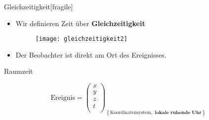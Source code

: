 \documentclass[]{beamer}%
\newcommand{\drawBasis}[5]{%
    \tikzmath{  \sLW=#2;}
    \draw[line width=1pt*\sLW,->] (0,0,0) -- (1,0,0) node[scale=#1, anchor=north east]{$#3$};
    \draw[line width=1pt*\sLW,->] (0,0,0) -- (0,1,0) node[scale=#1, anchor=south]{$#4$};
    \draw[line width=1pt*\sLW,->] (0,0,0) -- (0,0,1) node[scale=#1, anchor=south]{$#5$};
}
\newcommand{\clock}[6]{%
    \begin{scope}[xshift=#1, yshift=#2, scale=#3, line cap=round]
        \tikzmath{
            \sLW = #4;  %
        } 
        \draw [line width=1.6pt*\sLW] (0,0) circle (1.15cm);
        \foreach \angle in {0, 30, ..., 330} 
            \draw[line width=1pt*\sLW] (\angle:0.89cm) -- (\angle:1cm);
        \foreach \angle in {0,90,180,270}
            \draw[line width=1.4pt*\sLW] (\angle:0.82cm) -- (\angle:1cm);
        \draw[line width=1.6pt*\sLW] (0,0) -- (90-30*#5:0.4cm); %
        \draw[line width=1.3pt*\sLW] (0,0) -- (90-6*#6:0.65cm); %
    \end{scope}
}
\newcommand{\guy}[4]{%
    \begin{scope}[xshift=#1,yshift=#2,scale=#3]
        \tikzmath{
            \sLW = #4;  %
        } 
        \draw[line width=2pt*\sLW] (0,0) circle (1cm);               %
        \draw[fill=black] (35:0.3cm) circle (0.08cm*\sLW);           %
        \draw[fill=black] (145:0.3cm) circle (0.08cm*\sLW);          %
        \draw[line width=2pt*\sLW] ([shift={+(0cm,0cm)}]245:0.5cm) arc (245:295:0.5cm);
        
        \draw[line width=2pt*\sLW] (0,-1cm) -- ++(-90:2.25cm);       %
        \draw[line width=2pt*\sLW] (0,-2cm) -- ++(30:1.5cm);         %
        \draw[line width=2pt*\sLW] (0,-2cm) -- ++(150:1.5cm);        %
        \draw[line width=2pt*\sLW] (0,-3.25cm) -- ++(-60:1.5cm);     %
        \draw[line width=2pt*\sLW] (0,-3.25cm) -- ++(240:1.5cm);     %
    \end{scope}
}
\newcommand{\rail}[5]{%
    \begin{scope}[xshift=#1, yshift=#2, scale=#3]
        \tikzmath{
            \sLW = #4;
        }
        \draw[line width=2pt*\sLW] (-0.1cm,0) -- (#5,0);
        \draw[line width=1pt*\sLW, dashed] (0,-0.1cm) node[below]{Ziel} -- (0,2cm) ;
    \end{scope}
}
\newcommand{\locomotive}[4]{%
    \begin{scope}[xshift=#1, yshift=#2, scale=#3]
        \tikzmath{
            \sLW = #4;
        }
        \draw[line width=2pt*\sLW] (0,0.3cm) 
            -- ++(6cm,  0) 
            -- ++(0,    1.4cm) 
            -- ++(-5cm, 0) 
            --   (0,    0.3cm);
        \draw[line width=2pt*\sLW] (0.5cm,0.9cm) -- ++(1.5cm,0) -- (2.0cm,1.7cm); 
        \foreach \wheel in {1,2,3.5,4.5,5.5}{
            \draw [line width=2pt*\sLW]([shift={(\wheel,0.3cm)}]180:0.3cm) arc (180:360:0.3cm);
        }
    \end{scope}
}
\newcommand{\railCar}[4]{%
    \begin{scope}[xshift=#1, yshift=#2, scale=#3]
        \tikzmath{
            \sLW = #4;
        } 
        \draw[line width=2pt*\sLW] 
                  (0,   0.3cm) 
            --  ++(5cm, 0)
            --  ++(0,   1.4cm)
            --  ++(-5cm,0)
            --    (0,   0.3cm);
        \foreach \wheel in {0.8,1.8,3.2,4.2}{
            \draw [line width=2pt*\sLW]
                ([shift={(\wheel,0.3cm)}]180:0.3cm) arc (180:360:0.3cm);
        }
    \end{scope}
}
\newcommand{\train}[4]{%
    \begin{scope}[shift={++(#1,#2)}, scale=#3]
        \rail{0}{0}{#3}{#4}{11.5cm};
        \locomotive{0}{0}{#3}{#4}; 
        \railCar{6.5cm*#3}{0}{#3}{#4};
    \end{scope}
}
\newcommand{\spaceTime}[9]{%
    \begin{scope}[xshift=#1, yshift=#2, scale=#3]
        \tdplotsetmaincoords{55}{30}
        \begin{scope}[scale=1, tdplot_main_coords]
            \drawBasis{#5}{#4}{#6}{#7}{#8}
            \begin{scope}[scale=2]
                \clock{0.43cm}{0.1cm}{0.15}{0.8*#4}{9}{5};
                \begin{scope}[xshift=0.7cm, yshift=0]    
                    \node[scale=#5](0,0){$#9$};
                \end{scope}
            \end{scope}
        \end{scope}
        \tdplotsetmaincoords{0}{0}
    \end{scope}
}
\begin{document}
\begin{frame}{Gleichzeitigkeit}[fragile]
    \begin{figure}[h]
        \centering
    \end{figure}

\end{frame}

\begin{frame}
    \begin{itemize}
        \item   Wir definieren Zeit über \textbf{Gleichzeitigkeit}\\
            \vspace{5pt}
            \begin{figure}[h]
                    \centering
                    \texttt{[image: gleichzeitigkeit2]}\\
                    \caption{\cite{Einstein1905}}
            \end{figure}
            \vspace{5pt}
        \item   Der Beobachter ist direkt am Ort des Ereignisses.
    \end{itemize}
\end{frame}

\begin{frame}{Raumzeit}
    \begin{figure}[h]
        \centering
        \begin{equation*}
            \text{Ereignis} = 
                \begin{pmatrix} 
                    x\\
                    y\\
                    z\\
                    t\\
                \end{pmatrix}_{ \left\{
                    \text{Koordinatensystem}, \textbf{ lokale ruhende Uhr}
                                \right\}}
        \end{equation*}
    \end{figure}        
\end{frame}
\end{document}
